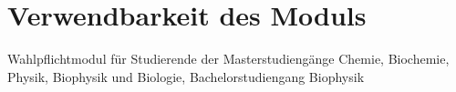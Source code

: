 \section{Verwendbarkeit des Moduls}
Wahlpflichtmodul für Studierende der Masterstudiengänge Chemie, Biochemie, Physik, Biophysik und Biologie, Bachelorstudiengang Biophysik